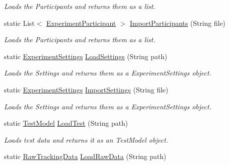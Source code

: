 \begin{DoxyCompactItemize}
\begin{DoxyCompactList}\small\item\em Loads the Participants and returns them as a list. \end{DoxyCompactList}\item 
static List$<$ \hyperlink{class_web_analyzer_1_1_models_1_1_base_1_1_experiment_participant}{Experiment\+Participant} $>$ \hyperlink{class_web_analyzer_1_1_controller_1_1_load_controller_aa27ea8be14f2856fad6a18b0d9ad1418}{Import\+Participants} (String file)
\begin{DoxyCompactList}\small\item\em Loads the Participants and returns them as a list. \end{DoxyCompactList}\item 
static \hyperlink{class_web_analyzer_1_1_models_1_1_settings_model_1_1_experiment_settings}{Experiment\+Settings} \hyperlink{class_web_analyzer_1_1_controller_1_1_load_controller_aac7916dc05a2869790dd010a8f5477d4}{Load\+Settings} (String path)
\begin{DoxyCompactList}\small\item\em Loads the Settings and returns them as a Experiment\+Settings object. \end{DoxyCompactList}\item 
static \hyperlink{class_web_analyzer_1_1_models_1_1_settings_model_1_1_experiment_settings}{Experiment\+Settings} \hyperlink{class_web_analyzer_1_1_controller_1_1_load_controller_a24780ee8066a3138c3782791cf7a8a00}{Import\+Settings} (String file)
\begin{DoxyCompactList}\small\item\em Loads the Settings and returns them as a Experiment\+Settings object. \end{DoxyCompactList}\item 
static \hyperlink{class_web_analyzer_1_1_models_1_1_data_model_1_1_test_model}{Test\+Model} \hyperlink{class_web_analyzer_1_1_controller_1_1_load_controller_ac708d0fc98accf17574e97f1e59a7dc9}{Load\+Test} (String path)
\begin{DoxyCompactList}\small\item\em Loads test data and returns it as an Test\+Model object. \end{DoxyCompactList}\item 
static \hyperlink{class_web_analyzer_1_1_models_1_1_base_1_1_raw_tracking_data}{Raw\+Tracking\+Data} \hyperlink{class_web_analyzer_1_1_controller_1_1_load_controller_a3c0d32fd4c9a0137ecc56d8950f03e68}{Load\+Raw\+Data} (String path)

\end{DoxyCompactItemize}

